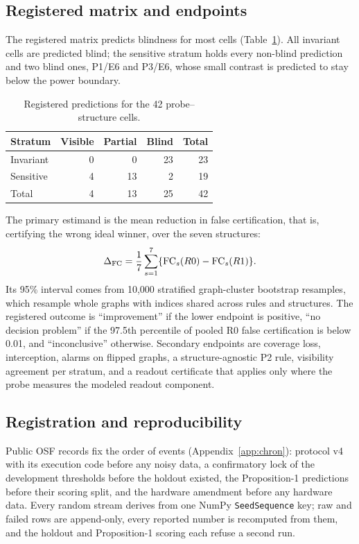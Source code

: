 \documentclass[10pt,twocolumn]{article}
\newcommand{\code}[1]{\texttt{#1}}
\begin{document}
\subsection{Registered matrix and endpoints}

The registered matrix predicts blindness for most cells
(Table~\ref{tab:matrix}). All invariant cells are predicted blind; the
sensitive stratum holds every non-blind prediction and two blind ones, P1/E6
and P3/E6, whose small contrast is predicted to stay below the power boundary.

\begin{table}[t]
\centering
\caption{Registered predictions for the 42 probe--structure cells.}
\label{tab:matrix}
\small
\begin{tabular}{@{}lrrrr@{}}
\toprule
Stratum & Visible & Partial & Blind & Total \\
\midrule
Invariant & 0 & 0 & 23 & 23 \\
Sensitive & 4 & 13 & 2 & 19 \\
\midrule
Total & 4 & 13 & 25 & 42 \\
\bottomrule
\end{tabular}
\end{table}

The primary estimand is the mean reduction in false certification, that is,
certifying the wrong ideal winner, over the seven structures:
\begin{equation}
 \Delta_{\rm FC}=\frac{1}{7}\sum_{s=1}^{7}
 \{\mathrm{FC}_s(R0)-\mathrm{FC}_s(R1)\}.
 \label{eq:dfc}
\end{equation}
Its 95\% interval comes from 10,000 stratified graph-cluster bootstrap
resamples, which resample whole graphs\cite{field2007} with indices shared
across rules and structures. The registered outcome is ``improvement'' if the
lower endpoint is positive, ``no decision problem'' if the 97.5th percentile of
pooled R0 false certification is below 0.01, and ``inconclusive'' otherwise.
Secondary endpoints are coverage loss, interception, alarms on flipped graphs,
a structure-agnostic P2 rule, visibility agreement per stratum, and a readout
certificate that applies only where the probe measures the modeled readout
component.

\subsection{Registration and reproducibility}

Public OSF records fix the order of events (Appendix~\ref{app:chron}):
protocol v4 with its execution code before any noisy data, a confirmatory lock
of the development thresholds before the holdout existed, the Proposition-1
predictions before their scoring split, and the hardware amendment before any
hardware data. Every random stream derives from one NumPy \code{SeedSequence}
key; raw and failed rows are append-only, every reported number is recomputed
from them, and the holdout and Proposition-1 scoring each refuse a second run.
\end{document}
